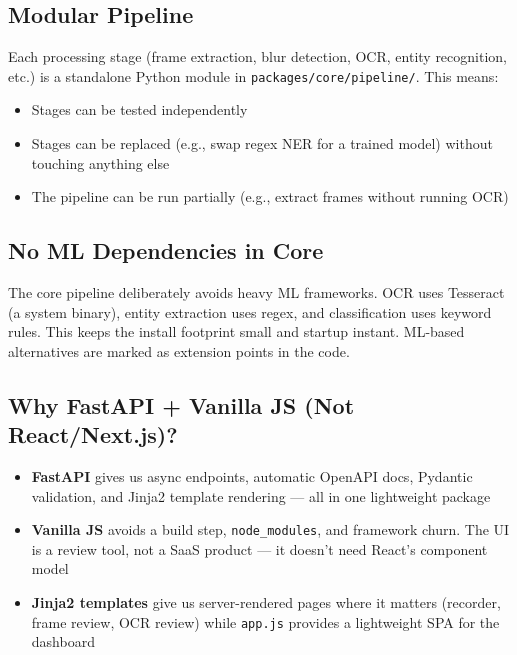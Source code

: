 \documentclass[12pt, a4paper]{article}
\newcommand{\codeinline}[1]{\texttt{\small\colorbox{codebg}{#1}}}
\newcommand{\filepath}[1]{\texttt{\small #1}}
\begin{document}
\subsection{Modular Pipeline}

Each processing stage (frame extraction, blur detection, OCR, entity recognition, etc.) is a standalone Python module in \filepath{packages/core/pipeline/}. This means:

\begin{itemize}
    \item Stages can be tested independently
    \item Stages can be replaced (e.g., swap regex NER for a trained model) without touching anything else
    \item The pipeline can be run partially (e.g., extract frames without running OCR)
\end{itemize}

\subsection{No ML Dependencies in Core}

The core pipeline deliberately avoids heavy ML frameworks. OCR uses Tesseract (a system binary), entity extraction uses regex, and classification uses keyword rules. This keeps the install footprint small and startup instant. ML-based alternatives are marked as extension points in the code.

\subsection{Why FastAPI + Vanilla JS (Not React/Next.js)?}

\begin{itemize}
    \item \textbf{FastAPI} gives us async endpoints, automatic OpenAPI docs, Pydantic validation, and Jinja2 template rendering --- all in one lightweight package
    \item \textbf{Vanilla JS} avoids a build step, \codeinline{node\_modules}, and framework churn. The UI is a review tool, not a SaaS product --- it doesn't need React's component model
    \item \textbf{Jinja2 templates} give us server-rendered pages where it matters (recorder, frame review, OCR review) while \codeinline{app.js} provides a lightweight SPA for the dashboard
\end{itemize}

\end{document}
